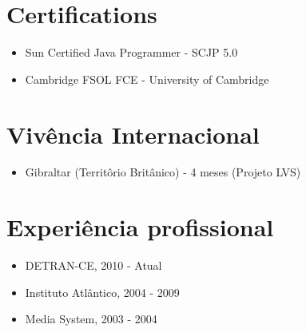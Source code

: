 \documentclass[letterpaper]{article}
\begin{document}
\section*{Certifications}
\begin{itemize}
  \item Sun Certified Java Programmer - SCJP 5.0
  \item Cambridge FSOL FCE - University of Cambridge
\end{itemize}

\section*{Vivência Internacional}
\begin{itemize}
  \item Gibraltar (Territôrio Britânico) - 4 meses (Projeto LVS)
\end{itemize}

\section*{Experiência profissional}

\begin{itemize}
\item DETRAN-CE, 2010 - Atual
\item Instituto Atlântico, 2004 - 2009
\item Media System, 2003 - 2004
\end{itemize}
\end{document}
